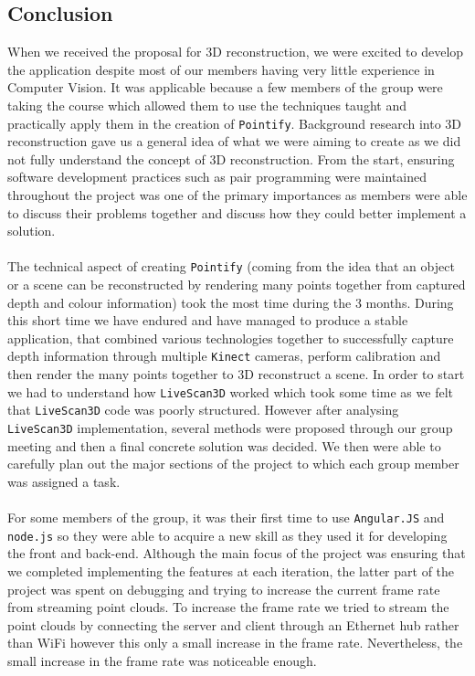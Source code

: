 \documentclass{article}
\begin{document}
\subsection{Conclusion}
When we received the proposal for 3D reconstruction, we were excited to develop the application despite most of our members having very little experience in Computer Vision. It was applicable because a few members of the group were taking the course which allowed them to use the techniques taught and practically apply them in the creation of \texttt{Pointify}. Background research into 3D reconstruction gave us a general idea of what we were aiming to create as we did not fully understand the concept of 3D reconstruction. From the start, ensuring software development practices such as pair programming were maintained throughout the project was one of the primary importances as members were able to discuss their problems together and discuss how they could better implement a solution.
\\\\
The technical aspect of creating \texttt{Pointify} (coming from the idea that an object or a scene can be reconstructed by rendering many points together from captured depth and colour information) took the most time during the 3 months. During this short time we have endured and have managed to produce a stable application, that combined various technologies together to successfully capture depth information through multiple \texttt{Kinect} cameras, perform calibration and then render the many points together to 3D reconstruct a scene. In order to start we had to understand how \texttt{LiveScan3D} \cite{livescan} worked which took some time as we felt that \texttt{LiveScan3D} \cite{livescan} code was poorly structured. However after analysing \texttt{LiveScan3D} \cite{livescan} implementation, several methods were proposed through our group meeting and then a final concrete solution was decided. We then were able to carefully plan out the major sections of the project to which each group member was assigned a task.
\\\\
For some members of the group, it was their first time to use \texttt{Angular.JS} \cite{angular} and \texttt{node.js} \cite{node} so they were able to acquire a new skill as they used it for developing the front and back-end. Although the main focus of the project was ensuring that we completed implementing the features at each iteration, the latter part of the project was spent on debugging and trying to increase the current frame rate from streaming point clouds. To increase the frame rate we tried to stream the point clouds by connecting the server and client through an Ethernet hub rather than WiFi however this only a small increase in the frame rate. Nevertheless, the small increase in the frame rate was noticeable enough. 
\end{document}
